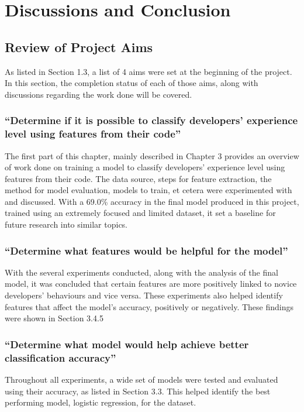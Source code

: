 \documentclass{report}
\begin{document}
\chapter{Discussions and Conclusion}

\section{Review of Project Aims}

As listed in Section 1.3, a list of 4 aims were set at the beginning of the project. In this section, the completion status of each of those aims, along with discussions regarding the work done will be covered.

\subsection{“Determine if it is possible to classify developers’ experience level using features from their code”}

The first part of this chapter, mainly described in Chapter 3 provides an overview of work done on training a model to classify developers’ experience level using features from their code. The data source, steps for feature extraction, the method for model evaluation, models to train, et cetera were experimented with and discussed. With a 69.0\% accuracy in the final model produced in this project, trained using an extremely focused and limited dataset, it set a baseline for future research into similar topics.

\subsection{“Determine what features would be helpful for the model”}

With the several experiments conducted, along with the analysis of the final model, it was concluded that certain features are more positively linked to novice developers’ behaviours and vice versa. These experiments also helped identify features that affect the model’s accuracy, positively or negatively. These findings were shown in Section 3.4.5

\subsection{“Determine what model would help achieve better classification accuracy”}

Throughout all experiments, a wide set of models were tested and evaluated using their accuracy, as listed in Section 3.3. This helped identify the best performing model, logistic regression, for the dataset.
\end{document}
